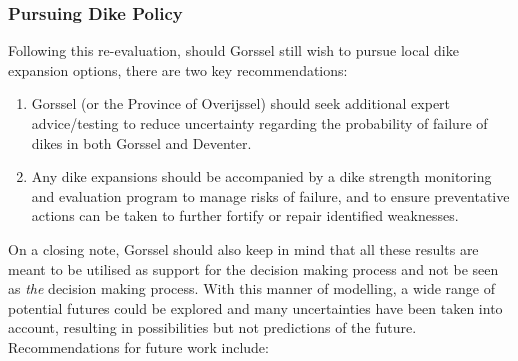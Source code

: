 \subsubsection{Pursuing Dike Policy}
Following this re-evaluation, should Gorssel still wish to pursue local dike expansion options, there are two key recommendations:
\begin{enumerate}
    \item Gorssel (or the Province of Overijssel) should seek additional expert advice/testing to reduce uncertainty regarding the probability of failure of dikes in both Gorssel and Deventer.
    \item Any dike expansions should be accompanied by a dike strength monitoring and evaluation program to manage risks of failure, and to ensure preventative actions can be taken to further fortify or repair identified weaknesses.
\end{enumerate}

\noindent On a closing note, Gorssel should also keep in mind that all these results are meant to be utilised as support for the decision making process and not be seen as \textit{the} decision making process. With this manner of modelling, a wide range of potential futures could be explored and many uncertainties have been taken into account, resulting in possibilities but not predictions of the future. Recommendations for future work include: 